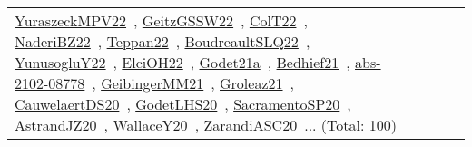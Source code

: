 {\begin{longtable}{lp{3cm}>{\raggedright\arraybackslash}p{6cm}>{\raggedright\arraybackslash}p{6cm}>{\raggedright\arraybackslash}p{8cm}}
\href{../works/YuraszeckMPV22.pdf}{YuraszeckMPV22}~\cite{YuraszeckMPV22}, \href{../works/GeitzGSSW22.pdf}{GeitzGSSW22}~\cite{GeitzGSSW22}, \href{../works/ColT22.pdf}{ColT22}~\cite{ColT22}, \href{../works/NaderiBZ22.pdf}{NaderiBZ22}~\cite{NaderiBZ22}, \href{../works/Teppan22.pdf}{Teppan22}~\cite{Teppan22}, \href{../works/BoudreaultSLQ22.pdf}{BoudreaultSLQ22}~\cite{BoudreaultSLQ22}, \href{../works/YunusogluY22.pdf}{YunusogluY22}~\cite{YunusogluY22}, \href{../works/ElciOH22.pdf}{ElciOH22}~\cite{ElciOH22}, \href{../works/Godet21a.pdf}{Godet21a}~\cite{Godet21a}, \href{../works/Bedhief21.pdf}{Bedhief21}~\cite{Bedhief21}, \href{../works/abs-2102-08778.pdf}{abs-2102-08778}~\cite{abs-2102-08778}, \href{../works/GeibingerMM21.pdf}{GeibingerMM21}~\cite{GeibingerMM21}, \href{../works/Groleaz21.pdf}{Groleaz21}~\cite{Groleaz21}, \href{../works/CauwelaertDS20.pdf}{CauwelaertDS20}~\cite{CauwelaertDS20}, \href{../works/GodetLHS20.pdf}{GodetLHS20}~\cite{GodetLHS20}, \href{../works/SacramentoSP20.pdf}{SacramentoSP20}~\cite{SacramentoSP20}, \href{../works/AstrandJZ20.pdf}{AstrandJZ20}~\cite{AstrandJZ20}, \href{../works/WallaceY20.pdf}{WallaceY20}~\cite{WallaceY20}, \href{../works/ZarandiASC20.pdf}{ZarandiASC20}~\cite{ZarandiASC20}... (Total: 100)\\

\end{longtable}}
